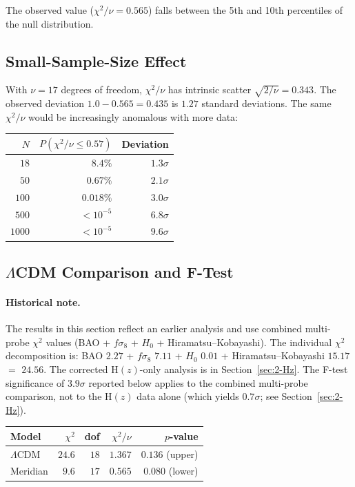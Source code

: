 \noindent
The observed value ($\chi^2/\nu = 0.565$) falls between the 5th and 10th percentiles of the null distribution.

\subsection{Small-Sample-Size Effect}

With $\nu = 17$ degrees of freedom, $\chi^2/\nu$ has intrinsic scatter $\sqrt{2/\nu} = 0.343$. The observed deviation $1.0 - 0.565 = 0.435$ is $1.27$ standard deviations. The same $\chi^2/\nu$ would be increasingly anomalous with more data:

\begin{center}
\begin{tabular}{r r r}
\hline
$N$ & $P(\chi^2/\nu \leq 0.57)$ & Deviation \\
\hline
$18$ & $8.4\%$ & $1.3\sigma$ \\
$50$ & $0.67\%$ & $2.1\sigma$ \\
$100$ & $0.018\%$ & $3.0\sigma$ \\
$500$ & $< 10^{-5}$ & $6.8\sigma$ \\
$1000$ & $< 10^{-5}$ & $9.6\sigma$ \\
\hline
\end{tabular}
\end{center}

\subsection{$\Lambda$CDM Comparison and F-Test}

\paragraph{Historical note.} The results in this section reflect an earlier analysis and use combined multi-probe $\chi^2$ values (BAO + $f\sigma_8$ + $H_0$ + Hiramatsu--Kobayashi). The individual $\chi^2$ decomposition is: BAO $2.27$ + $f\sigma_8$ $7.11$ + $H_0$ $0.01$ + Hiramatsu--Kobayashi $15.17$ $=$ $24.56$. The corrected H$(z)$-only analysis is in Section~\ref{sec:2-Hz}. The F-test significance of $3.9\sigma$ reported below applies to the combined multi-probe comparison, not to the H$(z)$ data alone (which yields $0.7\sigma$; see Section~\ref{sec:2-Hz}).

\begin{center}
\begin{tabular}{l r r r r}
\hline
Model & $\chi^2$ & dof & $\chi^2/\nu$ & $p$-value \\
\hline
$\Lambda$CDM & $24.6$ & $18$ & $1.367$ & $0.136$ (upper) \\
Meridian & $9.6$ & $17$ & $0.565$ & $0.080$ (lower) \\
\hline
\end{tabular}
\end{center}

